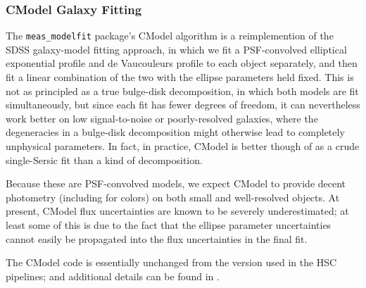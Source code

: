 \subsubsection{CModel Galaxy Fitting}
\label{sec:cmodel}

The \texttt{meas\_modelfit} package's CModel algorithm is a reimplemention of the SDSS galaxy-model fitting approach, in which we fit a PSF-convolved elliptical exponential profile and de Vaucouleurs profile to each object separately, and then fit a linear combination of the two with the ellipse parameters held fixed.
This is not as principled as a true bulge-disk decomposition, in which both models are fit simultaneously, but since each fit has fewer degrees of freedom, it can nevertheless work better on low signal-to-noise or poorly-resolved galaxies, where the degeneracies in a bulge-disk decomposition might otherwise lead to completely unphysical parameters.
In fact, in practice, CModel is better though of as a crude single-Sersic fit than a kind of decomposition.

Because these are PSF-convolved models, we expect CModel to provide decent photometry (including for colors) on both small and well-resolved objects.
At present, CModel flux uncertainties are known to be severely underestimated; at least some of this is due to the fact that the ellipse parameter uncertainties cannot easily be propagated into the flux uncertainties in the final fit.

The CModel code is essentially unchanged from the version used in the HSC pipelines; and additional details can be found in \citet{2018PASJ...70S...5B}.
